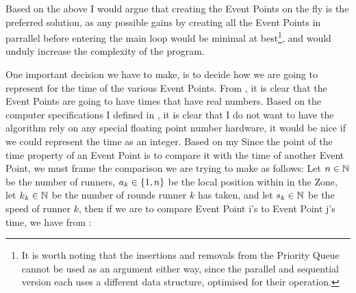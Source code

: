
Based on the above I would argue that creating the Event Points on the fly is the preferred solution, as any possible gains by creating all the Event Points in parrallel before entering the main loop would be minimal at best\footnote{It is worth noting that the insertions and removals from the Priority Queue cannot be used as an argument either way, since the parallel and sequential version each uses a different data structure, optimised for their operation.}, and would unduly increase the complexity of the program. 

One important decision we have to make, is to decide how we are going to represent for the time of the various Event Points. From , it is clear that the Event Points are going to have times that have real numbers. Based on the computer specifications I defined in , it is clear that I do not want to have the algorithm rely on any special floating point number hardware, it would be nice if we could represent the time as an integer. Based on my Since the point of the time property of an Event Point is to compare it with the time of another Event Point, we must frame the comparison we are trying to make as follows: Let $n \in \mathbb{N}$ be the number of runners, $a_k \in \{1, n\}$ be the local position within in the Zone, let $k_k \in \mathbb{N}$ be the number of rounds runner $k$ has taken, and let $s_k \in \mathbb{N}$ be the speed of runner $k$, then if we are to compare Event Point i's to Event Point j's time, we have from :
  

